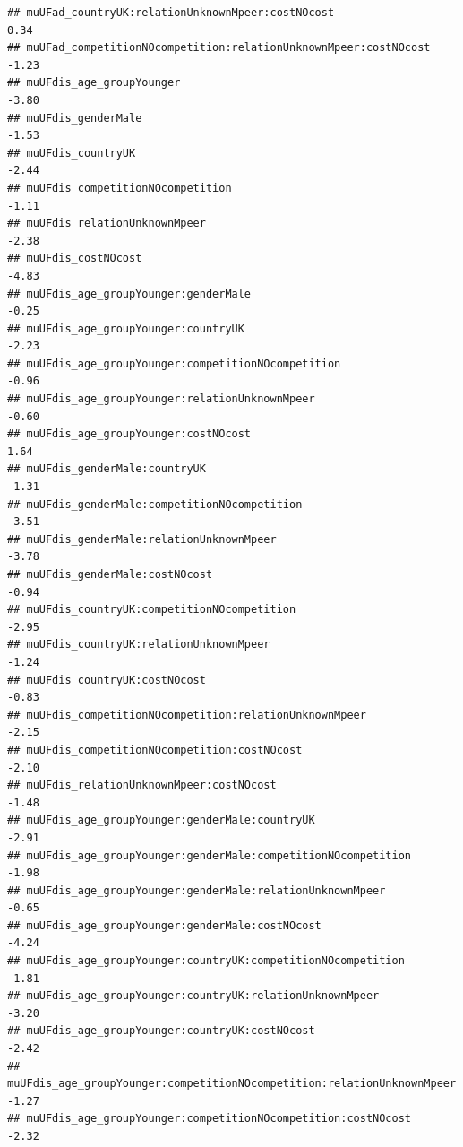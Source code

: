 \documentclass[
]{article}
\begin{document}
\begin{verbatim}
## muUFad_countryUK:relationUnknownMpeer:costNOcost                           0.34
## muUFad_competitionNOcompetition:relationUnknownMpeer:costNOcost           -1.23
## muUFdis_age_groupYounger                                                  -3.80
## muUFdis_genderMale                                                        -1.53
## muUFdis_countryUK                                                         -2.44
## muUFdis_competitionNOcompetition                                          -1.11
## muUFdis_relationUnknownMpeer                                              -2.38
## muUFdis_costNOcost                                                        -4.83
## muUFdis_age_groupYounger:genderMale                                       -0.25
## muUFdis_age_groupYounger:countryUK                                        -2.23
## muUFdis_age_groupYounger:competitionNOcompetition                         -0.96
## muUFdis_age_groupYounger:relationUnknownMpeer                             -0.60
## muUFdis_age_groupYounger:costNOcost                                        1.64
## muUFdis_genderMale:countryUK                                              -1.31
## muUFdis_genderMale:competitionNOcompetition                               -3.51
## muUFdis_genderMale:relationUnknownMpeer                                   -3.78
## muUFdis_genderMale:costNOcost                                             -0.94
## muUFdis_countryUK:competitionNOcompetition                                -2.95
## muUFdis_countryUK:relationUnknownMpeer                                    -1.24
## muUFdis_countryUK:costNOcost                                              -0.83
## muUFdis_competitionNOcompetition:relationUnknownMpeer                     -2.15
## muUFdis_competitionNOcompetition:costNOcost                               -2.10
## muUFdis_relationUnknownMpeer:costNOcost                                   -1.48
## muUFdis_age_groupYounger:genderMale:countryUK                             -2.91
## muUFdis_age_groupYounger:genderMale:competitionNOcompetition              -1.98
## muUFdis_age_groupYounger:genderMale:relationUnknownMpeer                  -0.65
## muUFdis_age_groupYounger:genderMale:costNOcost                            -4.24
## muUFdis_age_groupYounger:countryUK:competitionNOcompetition               -1.81
## muUFdis_age_groupYounger:countryUK:relationUnknownMpeer                   -3.20
## muUFdis_age_groupYounger:countryUK:costNOcost                             -2.42
## muUFdis_age_groupYounger:competitionNOcompetition:relationUnknownMpeer    -1.27
## muUFdis_age_groupYounger:competitionNOcompetition:costNOcost              -2.32

\end{verbatim}
\end{document}

